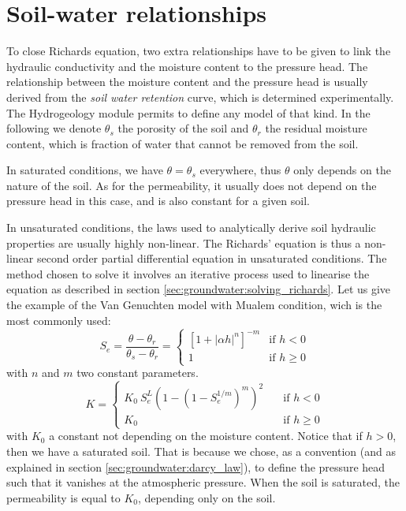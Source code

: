 \section{Soil-water relationships}\label{sec:groundwater:soil_water_laws}
To close Richards equation, two extra relationships have to be given to link the hydraulic conductivity and the moisture content to the pressure head.
The relationship between the moisture content and the pressure head is usually derived from the \textit{soil water retention} curve,
which is determined experimentally.
The Hydrogeology module permits to define any model of that kind.
In the following we denote $\theta_s$ the porosity of the soil and $\theta_r$ the residual moisture content, which is fraction of water that cannot be
removed from the soil.

In saturated conditions, we have $\theta = \theta_s$ everywhere, thus $\theta$ only depends on the nature of the soil.
As for the permeability, it usually does not depend on the pressure head in this case, and is also constant for a given soil.

In unsaturated conditions, the laws used to analytically derive soil hydraulic properties are usually highly non-linear.
The Richards' equation is thus a non-linear second order partial differential equation in unsaturated conditions.
The method chosen to solve it involves an iterative process used to linearise the equation as described in section \ref{sec:groundwater:solving_richards}.
Let us give the example of the Van Genuchten model with Mualem condition, wich is the most commonly used:
\begin{equation}
  S_e = \frac{\theta - \theta_r}{\theta_s - \theta_r} =
  \begin{cases}
     \left[1 + {\left|\alpha h\right|}^n \right]^{-m} &\text{if $h < 0$} \\
    1 \quad &\text{if $h \geq 0$}
  \end{cases}
\end{equation}
with $n$ and $m$ two constant parameters.
\begin{equation}
  K =
  \begin{cases}
    K_0 \ S_e^L \left( 1 - \left( 1 - S_e^{1/m} \right)^m\right)^2 \quad &\text{if $h < 0$} \\
    K_0 \hspace{2cm} \quad &\text{if $h \geq 0$}
  \end{cases}
\end{equation}
with $K_0$ a constant not depending on the moisture content. Notice that if $h > 0$, then we have a saturated soil.
That is because we chose, as a convention (and as explained in section \ref{sec:groundwater:darcy_law}), to define the pressure head such that it vanishes
at the atmospheric pressure.
When the soil is saturated,
the permeability is
equal to $K_0$, depending only on the soil.

